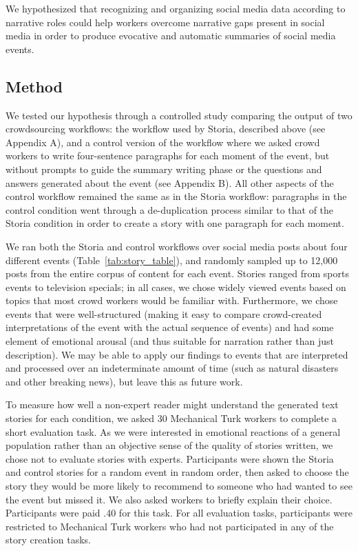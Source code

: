 We hypothesized that recognizing and organizing social media data according to narrative roles could help workers overcome narrative gaps present in social media in order to produce evocative and automatic summaries of social media events.


\subsection{Method}
We tested our hypothesis through a controlled study comparing the output of two crowdsourcing workflows: the workflow used by Storia, described above (see Appendix A), and a control version of the workflow where we asked crowd workers to write four-sentence paragraphs for each moment of the event, but without prompts to guide the summary writing phase or the questions and answers generated about the event (see Appendix B). All other aspects of the control workflow remained the same as in the Storia workflow: paragraphs in the control condition went through a de-duplication process similar to that of the Storia condition in order to create a story with one paragraph for each moment.

We ran both the Storia and control workflows over social media posts about four different events (Table~\ref{tab:story_table}), and randomly sampled up to 12,000 posts from the entire corpus of content for each event. Stories ranged from sports events to television specials; in all cases, we chose widely viewed events based on topics that most crowd workers would be familiar with. Furthermore, we chose events that were well-structured (making it easy to compare crowd-created interpretations of the event with the actual sequence of events) and had some element of emotional arousal (and thus suitable for narration rather than just description). 
We may be able to apply our findings to events that are interpreted and processed over an indeterminate amount of time (such as natural disasters and other breaking news), but leave this as future work.

To measure how well a non-expert reader might understand the generated text stories for each condition, we asked 30 Mechanical Turk workers to complete a short evaluation task. As we were interested in emotional reactions of a general population rather than an objective sense of the quality of stories written, we chose not to evaluate stories with experts. Participants were shown the Storia and control stories for a random event in random order, then asked to choose the story they would be more likely to recommend to someone who had wanted to see the event but missed it. We also asked workers to briefly explain their choice. Participants were paid \0.40 for this task. For all evaluation tasks, participants were restricted to Mechanical Turk workers who had not participated in any of the story creation tasks.



